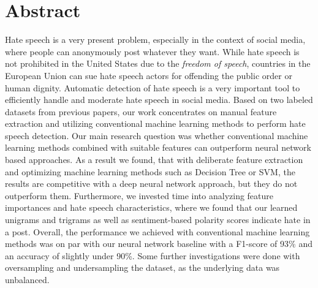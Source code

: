\section*{Abstract}

Hate speech is a very present problem, especially in the context of social media, where people can anonymously post whatever they want. While hate speech is not prohibited in the United States due to the \textit{freedom of speech}, countries in the European Union can sue hate speech actors for offending the public order or human dignity. Automatic detection of hate speech is a very important tool to efficiently handle and moderate hate speech in social media. 
Based on two labeled datasets from previous papers, our work concentrates on manual feature extraction and utilizing conventional machine learning methods to perform hate speech detection. Our main research question was whether conventional machine learning methods combined with suitable features can outperform neural network based approaches. As a result we found, that with deliberate feature extraction and optimizing machine learning methods such as Decision Tree or SVM, the results are competitive with a deep neural network approach, but they do not outperform them. Furthermore, we invested time into analyzing feature importances and hate speech cha\-rac\-te\-ris\-tics, where we found that our learned unigrams and trigrams as well as sentiment-based polarity scores indicate hate in a post.
Overall, the performance we achieved with conventional machine learning methods was on par with our neural network baseline with a F1-score of 93\% and an accuracy of slightly under 90\%.
Some further investigations were done with oversampling and undersampling the dataset, as the underlying data was unbalanced.

